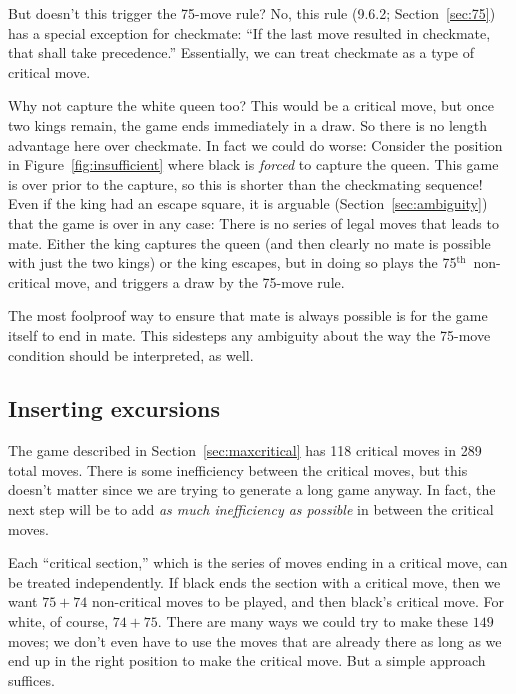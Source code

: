 \documentclass[twocolumn]{article}
\renewcommand\th{$^{\mathrm{th}}$}
\begin{document}
But doesn't this trigger the 75-move rule? No, this rule (9.6.2;
Section~\ref{sec:75}) has a special exception for checkmate: ``If the
last move resulted in checkmate, that shall take precedence.''
Essentially, we can treat checkmate as a type of critical move.

Why not capture the white queen too? This would be a critical move,
but once two kings remain, the game ends immediately in a draw. So
there is no length advantage here over checkmate. In fact we could do
worse: Consider the position in Figure~\ref{fig:insufficient} where
black is {\em forced} to capture the queen. This game is over prior to
the capture, so this is shorter than the checkmating sequence! Even if
the king had an escape square, it is arguable
(Section~\ref{sec:ambiguity}) that the game is over in any case: There
is no series of legal moves that leads to mate. Either the king
captures the queen (and then clearly no mate is possible with just the
two kings) or the king escapes, but in doing so plays the
75\th\ non-critical move, and triggers a draw by the 75-move rule.

The most foolproof way to ensure that mate is always possible is for the
game itself to end in mate. This sidesteps any ambiguity about the way
the 75-move condition should be interpreted, as well.


\subsection{Inserting excursions} \label{sec:excursions}

The game described in Section~\ref{sec:maxcritical} has 118 critical
moves in 289 total moves. There is some inefficiency between the
critical moves, but this doesn't matter since we are trying to generate
a long game anyway. In fact, the next step will be to add {\em as much
  inefficiency as possible} in between the critical moves.


Each ``critical section,'' which is the series of moves ending in a
critical move, can be treated independently. If black ends the section
with a critical move, then we want $75+74$ non-critical moves to be
played, and then black's critical move. For white, of course, $74+75$.
There are many ways we could try to make these $149$ moves; we don't
even have to use the moves that are already there as long as we end
up in the right position to make the critical move. But a simple
approach suffices.
\end{document}

